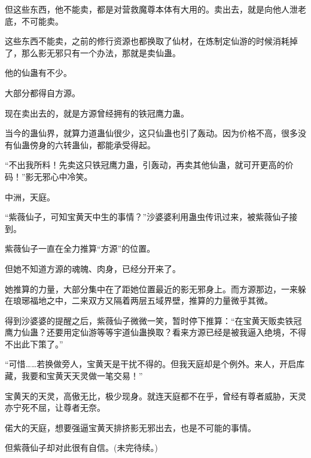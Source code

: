 \begin{this_body}
但这些东西，他不能卖，都是对营救魔尊本体有大用的。卖出去，就是向他人泄老底，不可能卖。

这些东西不能卖，之前的修行资源也都换取了仙材，在炼制定仙游的时候消耗掉了，那么影无邪只有一个办法，那就是卖仙蛊。

他的仙蛊有不少。

大部分都得自方源。

现在卖出去的，就是方源曾经拥有的铁冠鹰力蛊。

当今的蛊仙界，就算力道蛊仙很少，这只仙蛊也引了轰动。因为价格不高，很多没有仙蛊傍身的六转蛊仙，都能承受得起。

“不出我所料！先卖这只铁冠鹰力蛊，引轰动，再卖其他仙蛊，就可开更高的价码！”影无邪心中冷笑。

中洲，天庭。

“紫薇仙子，可知宝黄天中生的事情？”沙婆婆利用蛊虫传讯过来，被紫薇仙子接到。

紫薇仙子一直在全力推算“方源”的位置。

但她不知道方源的魂魄、肉身，已经分开来了。

她推算的力量，大部分集中在了距她位置最近的影无邪身上。而方源那边，一来躲在琅琊福地之中，二来双方又隔着两层五域界壁，推算的力量微乎其微。

得到沙婆婆的提醒之后，紫薇仙子微微一笑，暂时停下推算：“在宝黄天贩卖铁冠鹰力仙蛊？还要用定仙游等等宇道仙蛊换取？看来方源已经是被我逼入绝境，不得不出此下策了。”

“可惜……若换做旁人，宝黄天是干扰不得的。但我天庭却是个例外。来人，开启库藏，我要和宝黄天天灵做一笔交易！”

宝黄天的天灵，高傲无比，极少现身。就连天庭都不在乎，曾经有尊者威胁，天灵亦宁死不屈，让尊者无奈。

偌大的天庭，想要强逼宝黄天排挤影无邪出去，也是不可能的事情。

但紫薇仙子却对此很有自信。(未完待续。)

\end{this_body}

